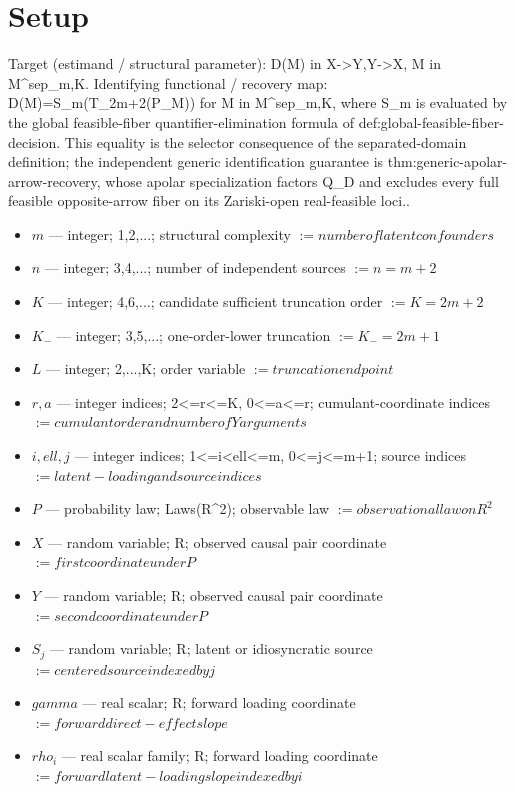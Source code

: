 \documentclass{article}
\begin{document}
\section{Setup}

Target (estimand / structural parameter): D(M) in {X->Y,Y->X}, M in M^{sep}_{m,K}.
Identifying functional / recovery map: D(M)=S_m(T_{2m+2}(P_M)) for M in M^{sep}_{m,K}, where S_m is evaluated by the global feasible-fiber quantifier-elimination formula of def:global-feasible-fiber-decision. This equality is the selector consequence of the separated-domain definition; the independent generic identification guarantee is thm:generic-apolar-arrow-recovery, whose apolar specialization factors Q_D and excludes every full feasible opposite-arrow fiber on its Zariski-open real-feasible loci..
\begin{itemize}
  \item $m$ --- integer; {1,2,...}; structural complexity $:= number of latent confounders$
  \item $n$ --- integer; {3,4,...}; number of independent sources $:= n=m+2$
  \item $K$ --- integer; {4,6,...}; candidate sufficient truncation order $:= K=2m+2$
  \item $K_-$ --- integer; {3,5,...}; one-order-lower truncation $:= K_-=2m+1$
  \item $L$ --- integer; {2,...,K}; order variable $:= truncation endpoint$
  \item $r,a$ --- integer indices; 2<=r<=K, 0<=a<=r; cumulant-coordinate indices $:= cumulant order and number of Y arguments$
  \item $i,ell,j$ --- integer indices; 1<=i<ell<=m, 0<=j<=m+1; source indices $:= latent-loading and source indices$
  \item $P$ --- probability law; Laws(R^2); observable law $:= observational law on R^2$
  \item $X$ --- random variable; R; observed causal pair coordinate $:= first coordinate under P$
  \item $Y$ --- random variable; R; observed causal pair coordinate $:= second coordinate under P$
  \item $S_j$ --- random variable; R; latent or idiosyncratic source $:= centered source indexed by j$
  \item $gamma$ --- real scalar; R; forward loading coordinate $:= forward direct-effect slope$
  \item $rho_i$ --- real scalar family; R; forward loading coordinate $:= forward latent-loading slope indexed by i$

\end{itemize}
\end{document}
